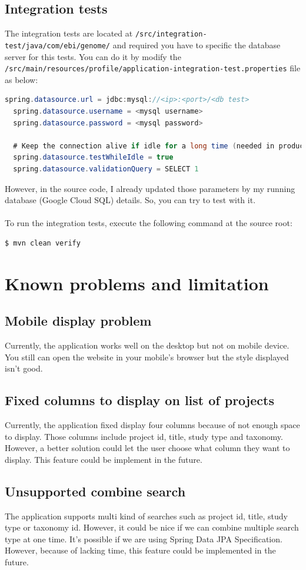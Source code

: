 \documentclass[a4paper,12pt]{article}
\begin{document}
\subsection{Integration tests}
The integration tests are located at \texttt{/src/integration-test/java/com/ebi/genome/} and required you have to specific the database server for this tests. You can do it by modify the \texttt{/src/main/resources/profile/application-integration-test.properties} file as below:

\begin{lstlisting}[language=java]
  spring.datasource.url = jdbc:mysql://<ip>:<port>/<db test>
  spring.datasource.username = <mysql username>
  spring.datasource.password = <mysql password>

  # Keep the connection alive if idle for a long time (needed in production)
  spring.datasource.testWhileIdle = true
  spring.datasource.validationQuery = SELECT 1
\end{lstlisting}
However, in the source code, I already updated those parameters by my running database (Google Cloud SQL) details. So, you can try to test with it.
\\
\\
To run the integration tests, execute the following command at the source root:
\\
\begin{lstlisting}[language=bash]
  $ mvn clean verify
\end{lstlisting}
\section{Known problems and limitation}
\subsection{Mobile display problem}
Currently, the application works well on the desktop but not on mobile device. You still can open the website in your mobile's browser but the style displayed isn't good.
\subsection{Fixed columns to display on list of projects}
Currently, the application fixed display four columns because of not enough space to display. Those columns include project id, title, study type and taxonomy. However, a better solution could let the user choose what column they want to display. This feature could be implement in the future.
\subsection{Unsupported combine search}
The application supports multi kind of searches such as project id, title, study type or taxonomy id. However, it could be nice if we can combine multiple search type at one time. It's possible if we are using Spring Data JPA Specification. However, because of lacking time, this feature could be implemented in the future.
\end{document}
